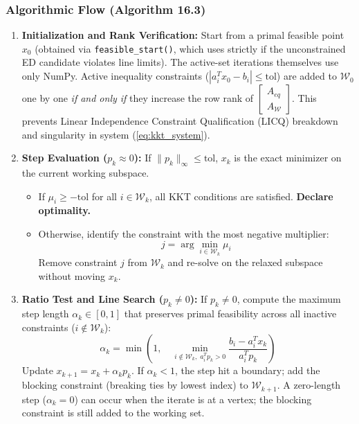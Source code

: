 \subsubsection{Algorithmic Flow (Algorithm 16.3)}
\begin{enumerate}
    \item \textbf{Initialization and Rank Verification:}
    Start from a primal feasible point $x_0$ (obtained via \texttt{feasible\_start()}, which uses  strictly if the unconstrained ED candidate violates line limits). The active-set iterations themselves use only NumPy. Active inequality constraints ($|a_i^T x_0 - b_i| \le \text{tol}$) are added to $\mathcal{W}_0$ one by one \textit{if and only if} they increase the row rank of $\begin{bmatrix} A_{eq} \\ A_{\mathcal{W}} \end{bmatrix}$. This prevents Linear Independence Constraint Qualification (LICQ) breakdown and singularity in system (\ref{eq:kkt_system}).

    \item \textbf{Step Evaluation ($p_k \approx 0$):}
    If $\|p_k\|_\infty \le \text{tol}$, $x_k$ is the exact minimizer on the current working subspace.
    \begin{itemize}
        \item If $\mu_i \ge -\text{tol}$ for all $i \in \mathcal{W}_k$, all KKT conditions are satisfied. \textbf{Declare optimality.}
        \item Otherwise, identify the constraint with the most negative multiplier:
        \begin{equation}
            j = \arg\min_{i \in \mathcal{W}_k} \mu_i
        \end{equation}
        Remove constraint $j$ from $\mathcal{W}_k$ and re-solve on the relaxed subspace without moving $x_k$.
    \end{itemize}

    \item \textbf{Ratio Test and Line Search ($p_k \neq 0$):}
    If $p_k \neq 0$, compute the maximum step length $\alpha_k \in [0, 1]$ that preserves primal feasibility across all inactive constraints ($i \notin \mathcal{W}_k$):
    \begin{equation}
        \alpha_k = \min \left( 1, \quad \min_{i \notin \mathcal{W}_k, \; a_i^T p_k > 0} \frac{b_i - a_i^T x_k}{a_i^T p_k} \right)
    \end{equation}
    Update $x_{k+1} = x_k + \alpha_k p_k$. If $\alpha_k < 1$, the step hit a boundary; add the blocking constraint (breaking ties by lowest index) to $\mathcal{W}_{k+1}$. A zero-length step ($\alpha_k = 0$) can occur when the iterate is at a vertex; the blocking constraint is still added to the working set.
\end{enumerate}

